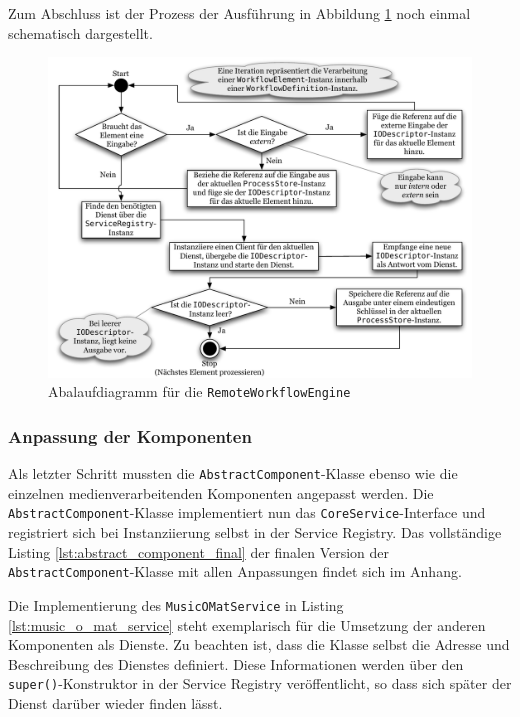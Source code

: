   Zum Abschluss ist der Prozess der Ausführung in Abbildung \ref{fig:images_WorkflowEngine_Flowchart} noch einmal schematisch dargestellt.
  
  \begin{figure}[!hb]
    \centering
      \includegraphics[height=.4\textheight]{images/WorkflowEngine_Flowchart.pdf}
    \caption{Abalaufdiagramm für die \texttt{RemoteWorkflowEngine}}
    \label{fig:images_WorkflowEngine_Flowchart}
  \end{figure}


\subsubsection{Anpassung der Komponenten} %
\label{ssub:anpassung_der_komponenten}

  Als letzter Schritt mussten die \verb!AbstractComponent!-Klasse ebenso wie die einzelnen medienverarbeitenden Komponenten angepasst werden. Die \verb!AbstractComponent!-Klasse implementiert nun das \verb!CoreService!-Interface und registriert sich bei Instanziierung selbst in der Service Registry. Das vollständige Listing \ref{lst:abstract_component_final} der finalen Version der \verb!AbstractComponent!-Klasse mit allen Anpassungen findet sich im Anhang.
  
  Die Implementierung des \verb!MusicOMatService! in Listing \ref{lst:music_o_mat_service} steht exemplarisch für die Umsetzung der anderen Komponenten als Dienste. Zu beachten ist, dass die Klasse selbst die Adresse und Beschreibung des Dienstes definiert. Diese Informationen werden über den \verb!super()!-Konstruktor in der Service Registry veröffentlicht, so dass sich später der Dienst darüber wieder finden lässt.

